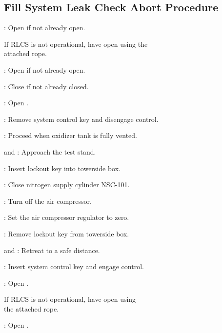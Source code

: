 \newpage
\subsection{Fill System Leak Check Abort Procedure}
\begin{checklist}
 \item \rlcs{}: Open \vent{} if not already open.
 \begin{checklist}[label=$\bullet$]
    \item If RLCS is not operational, have \primary{} open \moxdrain{} using the \\ \phantom{} \hspace{8ex} attached rope. 
    \end{checklist}
 \item \rlcs{}: Open \oxiso{} if not already open. 
 \item \rlcs{}: Close \oxfill{} if not already closed. 
 \item \rlcs{}: Open \oxdrain{}. 
 \item \rlcs{}: Remove system control key and disengage control.
 \item \ops{}: Proceed when oxidizer tank is fully vented. 
 \item \primary{} and \secondary: Approach the test stand. 
 \item \secondary{}: Insert lockout key into towerside box. 
 \item \primary{}: Close nitrogen supply cylinder NSC-101. 
 \item \primary{}: Turn off the air compressor.
 \item \primary{}: Set the air compressor regulator to zero. 
 \item \secondary{}: Remove lockout key from towerside box.
 \item \primary{} and \secondary{}: Retreat to a safe distance. 
 \item \rlcs{}: Insert system control key and engage control. 
 \item \rlcs{}: Open \oxfill{}. 
 \begin{checklist}[label=$\bullet$]
    \item If RLCS is not operational, have \primary{} open \moxfill{} using \\ \phantom{} \hspace{8ex} the attached rope. 
    \end{checklist}
\item \rlcs{}: Open \purge{}. 
\begin{checklist}[label=$\bullet$]

\end{checklist}
\end{checklist}
